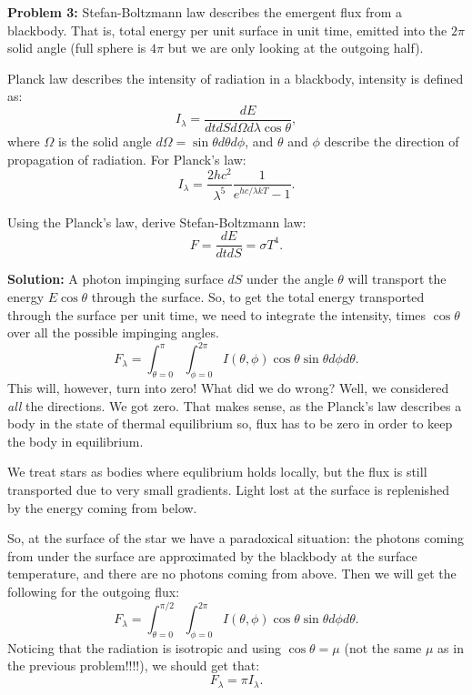 \documentclass[12pt]{article}
\begin{document}
\pagebreak

{\bf Problem 3:} Stefan-Boltzmann law describes the emergent flux from
a blackbody. That is, total energy per unit surface in unit time,
emitted into the $2\pi$ solid angle (full sphere is $4\pi$ but we are
only looking at the outgoing half).

Planck law describes the intensity of radiation in a blackbody,
intensity is defined as:
\begin{equation}
I_\lambda = \frac{dE}{dt dS d\Omega d\lambda \cos \theta},
\end{equation}
where $\Omega$ is the solid angle $d\Omega = \sin \theta d\theta
d\phi$, and $\theta$ and $\phi$ describe the direction of propagation
of radiation. For Planck's law:
\begin{equation}
I_\lambda = \frac{2hc^2}{\lambda^5} \frac{1}{e^{hc/\lambda k T} - 1}.
\end{equation}

Using the Planck's law, derive Stefan-Boltzmann law:
\begin{equation}
F = \frac{dE}{dt dS} = \sigma T^4.
\end{equation}

{\bf Solution:} A photon impinging surface $dS$ under the angle
$\theta$ will transport the energy $E \cos \theta$ through the
surface. So, to get the total energy transported through the surface
per unit time, we need to integrate the intensity, times $\cos \theta$
over all the possible impinging angles.
\begin{equation}
F_\lambda = \int_{\theta=0}^{\pi} \int_{\phi=0}^{2\pi} I(\theta, \phi) \cos \theta \sin \theta d \phi d \theta.
\end{equation}
This will, however, turn into zero! What did we do wrong? Well, we
considered \emph{all} the directions. We got zero. That makes sense,
as the Planck's law describes a body in the state of thermal
equilibrium so, flux has to be zero in order to keep the body in
equilibrium.

We treat stars as bodies where equlibrium holds locally, but the flux
is still transported due to very small gradients. Light lost at the
surface is replenished by the energy coming from below.

So, at the surface of the star we have a paradoxical situation: the
photons coming from under the surface are approximated by the
blackbody at the surface temperature, and there are no photons coming
from above. Then we will get the following for the outgoing flux:
\begin{equation}
F_\lambda = \int_{\theta=0}^{\pi/2} \int_{\phi=0}^{2\pi} I(\theta, \phi) \cos \theta \sin \theta d \phi d \theta.
\end{equation}
Noticing that the radiation is isotropic and using $\cos \theta = \mu$
(not the same $\mu$ as in the previous problem!!!!), we should get
that:
\begin{equation}
F_\lambda = \pi I_\lambda.
\end{equation}
\end{document}
